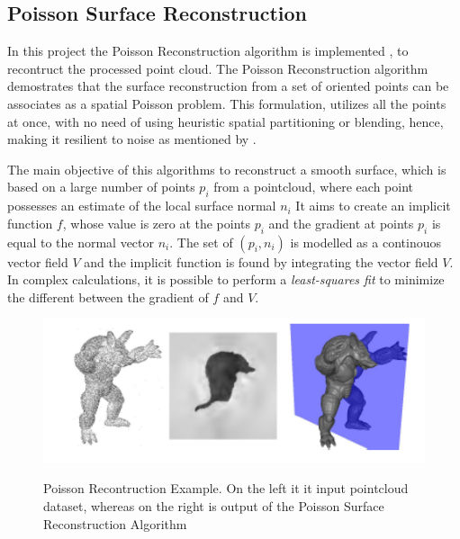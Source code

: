 \documentclass[12pt]{report}
\begin{document}
\subsection{Poisson Surface Reconstruction}
In this project the Poisson Reconstruction algorithm is implemented , to recontruct the processed point cloud.
The Poisson Reconstruction algorithm demostrates that the surface reconstruction from a set of oriented points can be associates as a spatial Poisson problem.
This formulation, utilizes all the points at once, with no need of using heuristic spatial partitioning or blending, hence, making it resilient to noise as mentioned by .

The main objective of this algorithms to reconstruct a smooth surface, which is based on a large number of points $p_i$ from a pointcloud, where each point possesses an estimate of the local surface normal $n_i$
It aims to create an implicit function $f$, whose value is zero at the points $p_i$ and the gradient at points $p_i$ is equal to the normal vector $n_i$.
The set of $(p_i,n_i)$ is modelled as a continouos vector field $V$ and the implicit function is found by integrating the vector field $V$.
In complex calculations, it is possible to perform a \textit{least-squares fit} to minimize the different between the gradient of $f$ and $V$.



\begin{figure}[H]%
  \centering
  \includegraphics[width=1\textwidth]{poisson_example.png}
 \caption{Poisson Recontruction Example. On the left it it input pointcloud dataset, whereas on the right is output of the Poisson Surface Reconstruction Algorithm}\cite[]{Poisson}
 \label{fig:Poisson_def} 
\end{figure}
\end{document}
